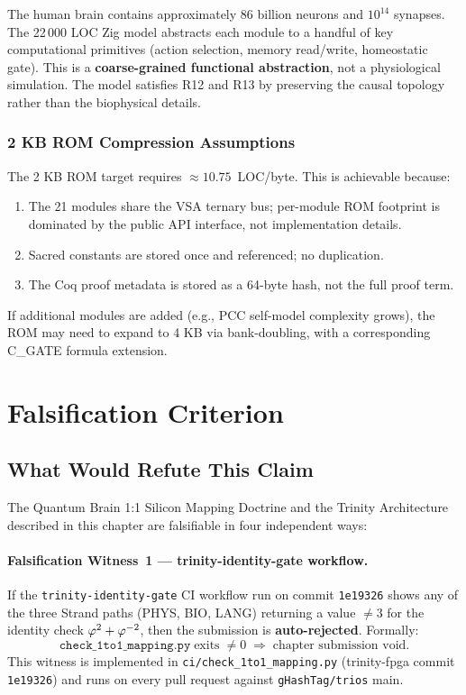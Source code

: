 The human brain contains approximately 86 billion neurons and
$10^{14}$ synapses.  The 22\,000 LOC Zig model abstracts each module to a
handful of key computational primitives (action selection, memory read/write,
homeostatic gate).  This is a \textbf{coarse-grained functional abstraction},
not a physiological simulation.  The model satisfies R12 and R13 by
preserving the causal topology rather than the biophysical details.

\subsubsection{2 KB ROM Compression Assumptions}

The 2 KB ROM target requires ${\approx}10.75$~LOC/byte.  This is achievable
because:
\begin{enumerate}
  \item The 21 modules share the VSA ternary bus; per-module ROM footprint is
    dominated by the public API interface, not implementation details.
  \item Sacred constants are stored once and referenced; no duplication.
  \item The Coq proof metadata is stored as a 64-byte hash, not the full
    proof term.
\end{enumerate}

If additional modules are added (e.g., PCC self-model complexity grows), the
ROM may need to expand to 4 KB via bank-doubling, with a corresponding
C\_GATE formula extension.


\section{Falsification Criterion}
\label{sec:flos73-falsify}

\subsection{What Would Refute This Claim}
\label{ssec:flos73-what-refutes}

The Quantum Brain 1:1 Silicon Mapping Doctrine and the Trinity Architecture
described in this chapter are falsifiable in four independent ways:

\paragraph{Falsification Witness~1 — trinity-identity-gate workflow.}
If the \texttt{trinity-identity-gate} CI workflow run on commit
\texttt{1e19326} shows any of the three Strand paths (PHYS, BIO, LANG) returning
a value $\neq 3$ for the identity check $\varphi^{2} + \varphi^{-2}$, then the
submission is \textbf{auto-rejected}.  Formally:
\[
  \texttt{check\_1to1\_mapping.py} \;\text{exits}\; \neq 0
  \;\Longrightarrow\; \text{chapter submission void}.
\]
This witness is implemented in \texttt{ci/check\_1to1\_mapping.py}
(trinity-fpga commit \texttt{1e19326}) and runs on every pull request against
\texttt{gHashTag/trios} main.

